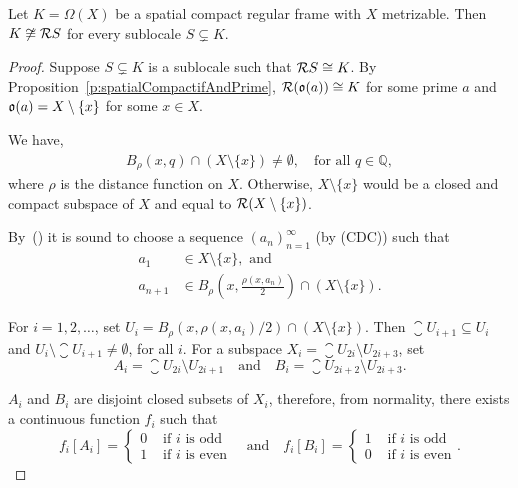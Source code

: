 \begin{theorem}
    Let $K = \Omega(X)$ be a spatial compact regular frame with $X$ metrizable. Then $K\not\cong \mathcal{R} S$ for every sublocale $S\subsetneq K$.
\end{theorem}
\begin{proof}
    Suppose $S\subsetneq K$ is a sublocale such that $\mathcal{R} S\cong K$. By Proposition~\ref{p:spatialCompactifAndPrime}, $\mathcal{R}(\mathfrak{o}(a))\cong K$ for some prime $a$ and $\mathfrak{o}(a) = X\setminus \{x\}$ for some $x\in X$.

    We have,
    \begin{align}
        B_\rho(x, q)\cap (X\setminus \{x\}) \neq \emptyset,\quad\text{for all } q\in \mathbb{Q},\label{e:ballsIntersect}
    \end{align}
    where $\rho$ is the distance function on $X$. Otherwise, $X\setminus \{x\}$ would be a closed and compact subspace of $X$ and equal to $\mathcal{R}(X\setminus \{x\})$.

    By~() it is sound to choose a sequence $(a_n)_{n=1}^\infty$ (by (CDC)) such that
    \begin{align*}
        a_1 &\in X\setminus \{x\},\text{ and} \\
        a_{n+1} &\in B_\rho\left(x, \frac{\rho(x,a_n)}{2}\right)\cap (X\setminus \{x\}).
    \end{align*}

    \noindent For $i = 1,2,\dots$, set $U_i = B_\rho(x,\rho(x,a_i)/2)\cap (X\setminus \{x\})$. Then $\closure{U}_{i+1}\subseteq U_i$ and $U_i\setminus \closure{U}_{i+1} \neq \emptyset$, for all $i$.
    For a subspace $X_i = \closure{U}_{2i}\setminus U_{2i+3}$, set
    $$ A_i = \closure{U}_{2i}\setminus U_{2i+1}\quad\text{and}\quad B_i = \closure{U}_{2i+2}\setminus U_{2i+3}. $$

    \noindent $A_i$ and $B_i$ are disjoint closed subsets of $X_i$, therefore, from normality, there exists a continuous function $f_i$ such that
    $$ f_i[A_i] = \begin{cases} 0 & \text{ if }i\text{ is odd} \\ 1 & \text{ if }i\text{ is even}\end{cases}
       \quad\text{and}\quad
       f_i[B_i] = \begin{cases} 1 & \text{ if }i\text{ is odd} \\ 0 & \text{ if }i\text{ is even}\end{cases}. $$


\end{proof}
